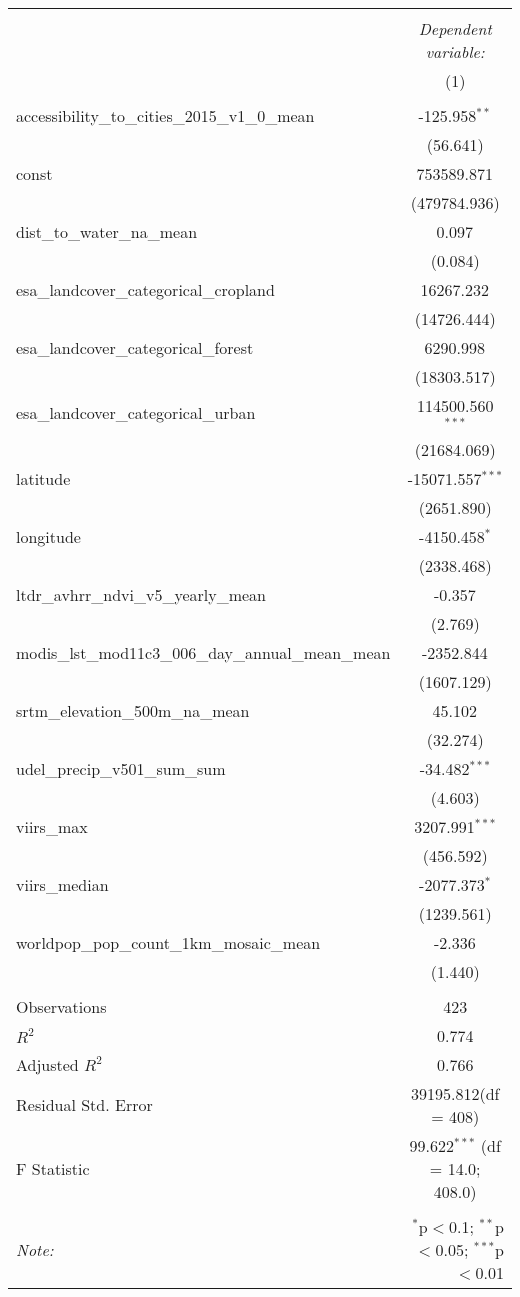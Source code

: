 \begin{table}[!htbp] \centering
\begin{tabular}{@{\extracolsep{5pt}}lc}
\\[-1.8ex]\hline
\hline \\[-1.8ex]
& \multicolumn{1}{c}{\textit{Dependent variable:}} \
\cr \cline{1-2}
\\[-1.8ex] & (1) \\
\hline \\[-1.8ex]
 accessibility_to_cities_2015_v1_0_mean & -125.958$^{**}$ \\
  & (56.641) \\
 const & 753589.871$^{}$ \\
  & (479784.936) \\
 dist_to_water_na_mean & 0.097$^{}$ \\
  & (0.084) \\
 esa_landcover_categorical_cropland & 16267.232$^{}$ \\
  & (14726.444) \\
 esa_landcover_categorical_forest & 6290.998$^{}$ \\
  & (18303.517) \\
 esa_landcover_categorical_urban & 114500.560$^{***}$ \\
  & (21684.069) \\
 latitude & -15071.557$^{***}$ \\
  & (2651.890) \\
 longitude & -4150.458$^{*}$ \\
  & (2338.468) \\
 ltdr_avhrr_ndvi_v5_yearly_mean & -0.357$^{}$ \\
  & (2.769) \\
 modis_lst_mod11c3_006_day_annual_mean_mean & -2352.844$^{}$ \\
  & (1607.129) \\
 srtm_elevation_500m_na_mean & 45.102$^{}$ \\
  & (32.274) \\
 udel_precip_v501_sum_sum & -34.482$^{***}$ \\
  & (4.603) \\
 viirs_max & 3207.991$^{***}$ \\
  & (456.592) \\
 viirs_median & -2077.373$^{*}$ \\
  & (1239.561) \\
 worldpop_pop_count_1km_mosaic_mean & -2.336$^{}$ \\
  & (1.440) \\
\hline \\[-1.8ex]
 Observations & 423 \\
 $R^2$ & 0.774 \\
 Adjusted $R^2$ & 0.766 \\
 Residual Std. Error & 39195.812(df = 408)  \\
 F Statistic & 99.622$^{***}$ (df = 14.0; 408.0) \\
\hline
\hline \\[-1.8ex]
\textit{Note:} & \multicolumn{1}{r}{$^{*}$p$<$0.1; $^{**}$p$<$0.05; $^{***}$p$<$0.01} \\
\end{tabular}
\end{table}